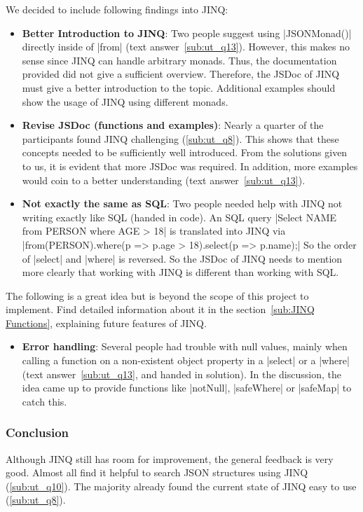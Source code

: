 We decided to include following findings into JINQ:
\begin{itemize}
  \item \textbf{Better Introduction to JINQ}: Two people suggest using
    |JSONMonad()| directly inside of |from| (text answer~\ref{sub:ut_q13}).
    However, this makes no sense since JINQ can handle arbitrary monads. Thus,
    the documentation provided did not give a sufficient overview.
    Therefore, the JSDoc of JINQ must give a better introduction to the topic.
    Additional examples should show the usage of JINQ using different monads.
  \item \textbf{Revise JSDoc (functions and examples)}: Nearly a quarter of the participants found JINQ
    challenging (\ref{sub:ut_q8}). This shows that these concepts needed to be
    sufficiently well introduced. From the solutions given to us, it is evident
    that more JSDoc was required. In addition, more examples would coin to a
    better understanding (text answer~\ref{sub:ut_q13}).
    \item \textbf{Not exactly the same as SQL}: Two people needed help with
      JINQ not writing exactly like SQL (handed in code). An SQL query
      |Select NAME from PERSON where AGE > 18| is translated into JINQ via
      |from(PERSON).where(p => p.age > 18).select(p => p.name);| So the order
      of |select| and |where| is reversed. So the JSDoc of JINQ needs to
      mention more clearly that working with JINQ is different than working
      with SQL.
\end{itemize}

The following is a great idea but is beyond the scope of this project to
implement. Find detailed information about it in the section~\ref{sub:JINQ
Functions}, explaining future features of JINQ.
\begin{itemize}
  \item \textbf{Error handling}: Several people had trouble with null values,
    mainly when calling a  function on a non-existent object
    property in a |select| or a |where| (text answer~\ref{sub:ut_q13}, and
    handed in solution). In the discussion, the idea came up to
    provide functions like |notNull|, |safeWhere| or |safeMap| to catch this.
\end{itemize}

\subsubsection{Conclusion} %
\label{subsub:usertest_jinq_Conclusion}
Although JINQ still has room for improvement, the general feedback is very
good. Almost all find it helpful to search JSON structures using JINQ
(\ref{sub:ut_q10}). The majority already found the current state of JINQ easy
to use (\ref{sub:ut_q8}).

